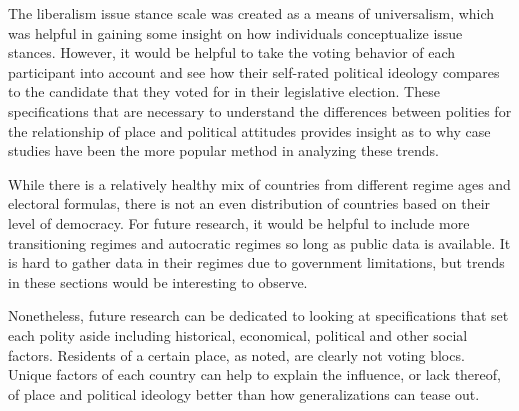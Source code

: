 \documentclass[12pt, titlepage]{article}
\begin{document}
The liberalism issue stance scale was created as a means of universalism, which was helpful in gaining some insight on how individuals conceptualize issue stances. However, it would be helpful to take the voting behavior of each participant into account and see how their self-rated political ideology compares to the candidate that they voted for in their legislative election. These specifications that are necessary to understand the differences between polities for the relationship of place and political attitudes provides insight as to why case studies have been the more popular method in analyzing these trends. 

While there is a relatively healthy mix of countries from different regime ages and electoral formulas, there is not an even distribution of countries based on their level of democracy. For future research, it would be helpful to include more transitioning regimes and autocratic regimes so long as public data is available. It is hard to gather data in their regimes due to government limitations, but trends in these sections would be interesting to observe.

Nonetheless, future research can be dedicated to looking at specifications that set each polity aside including historical, economical, political and other social factors. Residents of a certain place, as \cite{holloway_burning_2007} noted, are clearly not voting blocs. Unique factors of each country can help to explain the influence, or lack thereof, of place and political ideology better than how generalizations can tease out.       

\clearpage




\appendixtitleon
\appendixtitletocon
\end{document}
